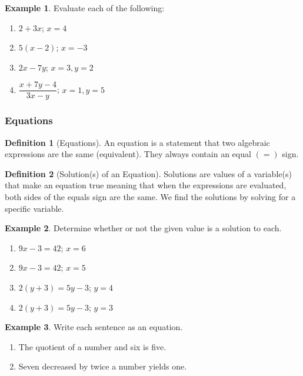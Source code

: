 \documentclass[addpoints,12pt]{exam}
\theoremstyle{definition}
\newtheorem{example}{Example}[subsection]
\newtheorem{definition}{Definition}[subsection]
\begin{document}
\vspace{.5in}

\begin{example}
Evaluate each of the following:
\begin{enumerate}
\item $2 + 3x$; $x = 4$
\vspace{1in}
\item $5(x-2)$; $x = -3$
\vspace{1in}
\item $2x-7y$; $x = 3, y = 2$
\vspace{1in}
\item $\dfrac{x+7y-4}{3x-y}$; $x = 1, y = 5$
\end{enumerate}
\end{example}

\newpage

\subsubsection*{Equations}
\begin{definition}[Equations]
An equation is a statement that two algebraic expressions are the same (equivalent). They always contain an equal $(=)$ sign.
\end{definition}

\begin{definition}[Solution(s) of an Equation]
Solutions are values of a variable(s) that make an equation true meaning that when the expressions are evaluated, both sides of the equals sign are the same. We find the solutions by solving for a specific variable.
\end{definition}
\vspace{.5in}
\begin{example}
Determine whether or not the given value is a solution to each.
\begin{enumerate}
\item $9x - 3 = 42$; $x = 6$
\vspace{1in}
\item $9x - 3 = 42$; $x = 5$
\vspace{1in}
\item $2(y+3) = 5y-3$; $y = 4$
\vspace{1in}
\item $2(y+3) = 5y-3$; $ y = 3$
\end{enumerate}
\end{example}
\newpage
\begin{example}
Write each sentence as an equation.
\begin{enumerate}
\item The quotient of a number and six is five.
\vspace{.5in}
\item Seven decreased by twice a number yields one.
\vspace{.5in}
\end{enumerate}
\end{example}
\end{document}
